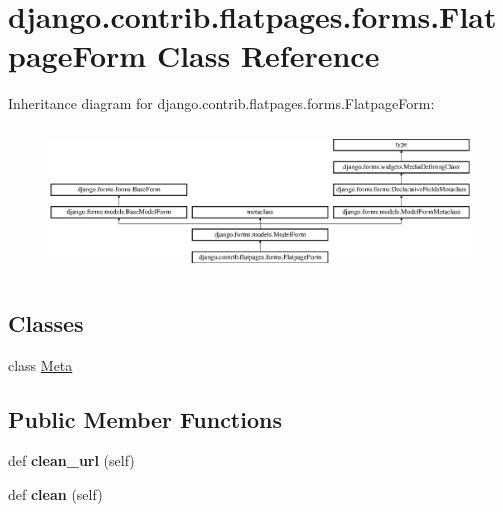 \hypertarget{classdjango_1_1contrib_1_1flatpages_1_1forms_1_1_flatpage_form}{}\section{django.\+contrib.\+flatpages.\+forms.\+Flatpage\+Form Class Reference}
\label{classdjango_1_1contrib_1_1flatpages_1_1forms_1_1_flatpage_form}
Inheritance diagram for django.\+contrib.\+flatpages.\+forms.\+Flatpage\+Form\+:\begin{figure}[H]
\begin{center}
\leavevmode
\includegraphics[height=3.888889cm]{classdjango_1_1contrib_1_1flatpages_1_1forms_1_1_flatpage_form}
\end{center}
\end{figure}
\subsection*{Classes}
\begin{DoxyCompactItemize}
\item 
class \mbox{\hyperlink{classdjango_1_1contrib_1_1flatpages_1_1forms_1_1_flatpage_form_1_1_meta}{Meta}}
\end{DoxyCompactItemize}
\subsection*{Public Member Functions}
\begin{DoxyCompactItemize}
\item 
\mbox{\label{classdjango_1_1contrib_1_1flatpages_1_1forms_1_1_flatpage_form_a8bd0caf3375366699290f6a5552f2060}} 
def {\bfseries clean\+\_\+url} (self)
\item 
\mbox{\label{classdjango_1_1contrib_1_1flatpages_1_1forms_1_1_flatpage_form_a51d9513fb11818ccc8bc81139ce29bed}} 
def {\bfseries clean} (self)
\end{DoxyCompactItemize}
